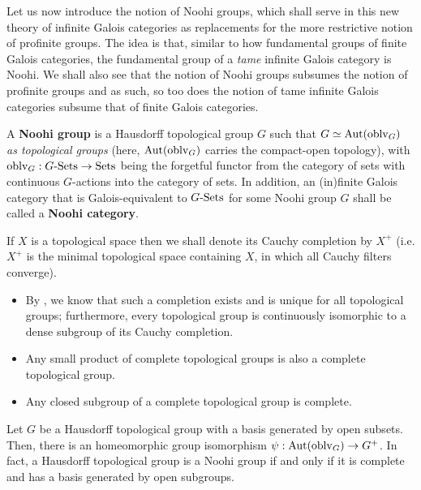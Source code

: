             Let us now introduce the notion of Noohi groups, which shall serve in this new theory of infinite Galois categories as replacements for the more restrictive notion of profinite groups. The idea is that, similar to how fundamental groups of finite Galois categories, the fundamental group of a \textit{tame} infinite Galois category is Noohi. We shall also see that the notion of Noohi groups subsumes the notion of profinite groups and as such, so too does the notion of tame infinite Galois categories subsume that of finite Galois categories.
            \begin{definition} \label{def: noohi_groups}
                \cite[Defintion 7.1.1]{bhatt_scholze_2014_pro_etale} A \textbf{Noohi group} is a Hausdorff topological group $G$ such that $G \simeq \mathrm{Aut}(\mathrm{oblv}_G)$ \textit{as topological groups} (here, $\mathrm{Aut}(\mathrm{oblv}_G)$ carries the compact-open topology), with $\mathrm{oblv}_G: G\text{-}\mathrm{Sets} \to \mathrm{Sets}$ being the forgetful functor from the category of sets with continuous $G$-actions into the category of sets. In addition, an (in)finite Galois category that is Galois-equivalent to $G\text{-}\mathrm{Sets}$ for some Noohi group $G$ shall be called a \textbf{Noohi category}.
            \end{definition}
            \begin{remark} \label{remark: completions_of_topological_groups}
                If $X$ is a topological space then we shall denote its Cauchy completion by $X^+$ (i.e. $X^+$ is the minimal topological space containing $X$, in which all Cauchy filters converge). 
                    \begin{itemize}
                        \item By \cite[Theorem 3.6.10]{topological_groups_and_related_structures}, we know that such a completion exists and is unique for all topological groups; furthermore, every topological group is continuously isomorphic to a dense subgroup of its Cauchy completion. 
                        \item \cite[Theorem 3.6.22]{topological_groups_and_related_structures} Any small product of complete topological groups is also a complete topological group.
                        \item Any closed subgroup of a complete topological group is complete.
                    \end{itemize}
            \end{remark}
            \begin{proposition} \label{prop: noohi_groups_are_complete}
                \cite[Proposition 7.1.5]{bhatt_scholze_2014_pro_etale} Let $G$ be a Hausdorff topological group with a basis generated by open subsets. Then, there is an homeomorphic group isomorphism $\psi: \mathrm{Aut}(\mathrm{oblv}_G) \to G^+$. In fact, a Hausdorff topological group is a Noohi group if and only if it is complete and has a basis generated by open subgroups.
            \end{proposition}
